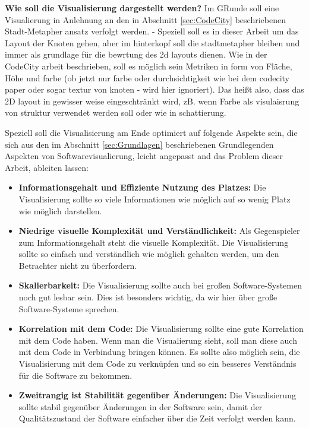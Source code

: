 \textbf{Wie soll die Visualisierung dargestellt werden?}
Im GRunde soll eine Visualierung in Anlehnung an den in Abschnitt \ref{sec:CodeCity} beschriebenen Stadt-Metapher ansatz verfolgt werden. - Speziell soll es in dieser Arbeit um das Layout der Knoten gehen, aber im hinterkopf soll die stadtmetapher bleiben und immer als grundlage für die bewrtung des 2d layouts dienen. 
Wie in der CodeCity arbeit beschrieben, soll es möglich sein Metriken in form von Fläche, Höhe und farbe (ob jetzt nur farbe oder durchsichtigkeit wie bei dem codecity paper oder sogar textur von knoten - wird hier ignoriert). Das heißt also, dass das 2D layout in gewisser weise eingeschtränkt wird, zB. wenn Farbe als visulaisrung von struktur verwendet werden soll oder wie in \cite{bruls2000squarified} schattierung.

Speziell soll die Visualisierung am Ende optimiert auf folgende Aspekte sein, die sich aus den im Abschnitt \ref{sec:Grundlagen} beschriebenen Grundlegenden Aspekten von Softwarevisualierung, leicht angepasst and das Problem dieser Arbeit, ableiten lassen: 

\begin{itemize}
    \item \textbf{Informationsgehalt und Effiziente Nutzung des Platzes:} Die Visualisierung sollte so viele Informationen wie möglich auf so wenig Platz wie möglich darstellen.
    \item \textbf{Niedrige visuelle Komplexität und Verständlichkeit:} Als Gegenspieler zum Informationsgehalt steht die visuelle Komplexität. Die Visualisierung sollte so einfach und verständlich wie möglich gehalten werden, um den Betrachter nicht zu überfordern.
    \item \textbf{Skalierbarkeit:} Die Visualisierung sollte auch bei großen Software-Systemen noch gut lesbar sein. Dies ist besonders wichtig, da wir hier über große Software-Systeme sprechen.
    \item \textbf{Korrelation mit dem Code:} Die Visualisierung sollte eine gute Korrelation mit dem Code haben. Wenn man die Visualierung sieht, soll man diese auch mit dem Code in Verbindung bringen können. Es sollte also möglich sein, die Visualisierung mit dem Code zu verknüpfen und so ein besseres Verständnis für die Software zu bekommen.
    \item \textbf{Zweitrangig ist Stabilität gegenüber Änderungen:} Die Visualisierung sollte stabil gegenüber Änderungen in der Software sein, damit der Qualitätszustand der Software einfacher über die Zeit verfolgt werden kann.
\end{itemize}